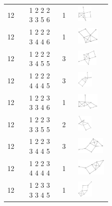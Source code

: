 \begin{footnotesize}
\begin{longtable}{m{0.07\linewidth} m{0.15\linewidth} m{0.05\linewidth} m{0.15\linewidth}}
12 & 1 2 2 2 3 3 5 6 & 1 & \includegraphics[height=0.8cm]{15-universal-graphs/img/degree-sequences-example-graphs/graph-4-8-16}\\
12 & 1 2 2 2 3 4 4 6 & 1 & \includegraphics[height=0.8cm]{15-universal-graphs/img/degree-sequences-example-graphs/graph-4-8-17}\\
12 & 1 2 2 2 3 4 5 5 & 3 & \includegraphics[height=0.8cm]{15-universal-graphs/img/degree-sequences-example-graphs/graph-4-8-18}\\
12 & 1 2 2 2 4 4 4 5 & 3 & \includegraphics[height=0.8cm]{15-universal-graphs/img/degree-sequences-example-graphs/graph-4-8-19}\\
12 & 1 2 2 3 3 3 4 6 & 1 & \includegraphics[height=0.8cm]{15-universal-graphs/img/degree-sequences-example-graphs/graph-4-8-20}\\
12 & 1 2 2 3 3 3 5 5 & 2 & \includegraphics[height=0.8cm]{15-universal-graphs/img/degree-sequences-example-graphs/graph-4-8-21}\\
12 & 1 2 2 3 3 4 4 5 & 3 & \includegraphics[height=0.8cm]{15-universal-graphs/img/degree-sequences-example-graphs/graph-4-8-22}\\
12 & 1 2 2 3 4 4 4 4 & 1 & \includegraphics[height=0.8cm]{15-universal-graphs/img/degree-sequences-example-graphs/graph-4-8-23}\\
12 & 1 2 3 3 3 3 4 5 & 1 & \includegraphics[height=0.8cm]{15-universal-graphs/img/degree-sequences-example-graphs/graph-4-8-24}\\

\end{longtable}
\end{footnotesize}
